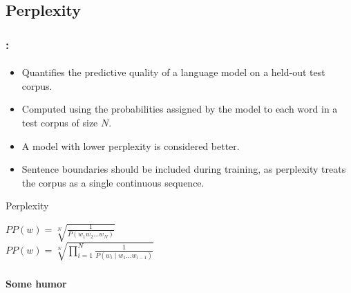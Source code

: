 \documentclass[xcolor=table]{beamer}
\begin{document}
\subsection{Perplexity}

\begin{frame}
	\frametitle{\insertshortsubtitle: \insertsection}
	\framesubtitle{\insertsubsection}
	
	\begin{itemize}
		\item Quantifies the predictive quality of a language model on a held-out test corpus.
		\item Computed using the probabilities assigned by the model to each word in a test corpus of size $N$.
		\item A model with lower perplexity is considered better.
		\item Sentence boundaries should be included during training, as perplexity treats the corpus as a single continuous sequence.
	\end{itemize}
	
	\begin{block}{Perplexity}
		\begin{center}
			$PP(w) = \sqrt[N]{\frac{1}{P(w_1 w_2 \ldots w_N)}}$ \\
			$PP(w) = \sqrt[N]{\prod\limits_{i=1}^{N} \frac{1}{P(w_i \mid w_1 \ldots w_{i-1})}}$
		\end{center}
	\end{block}
	
\end{frame}



\begin{frame}
	\frametitle{\insertshortsubtitle}
	\framesubtitle{Some humor}

	\begin{center}
	\end{center}

\end{frame}

\end{document}
